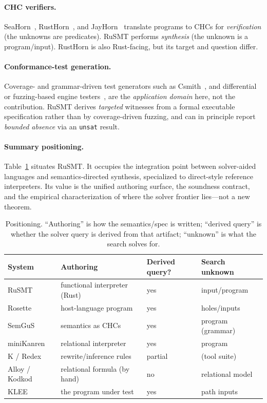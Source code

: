 \documentclass[11pt,a4paper]{article}
\theoremstyle{definition}
\theoremstyle{remark}
\newcommand{\rusmt}{RuSMT}
\newcommand{\code}[1]{\texttt{#1}}
\begin{document}
\paragraph{CHC verifiers.}
SeaHorn~\cite{gurfinkel2015seahorn}, RustHorn~\cite{matsushita2020rusthorn}, and
JayHorn~\cite{kahsai2016jayhorn} translate programs to CHCs for
\emph{verification} (the unknowns are predicates). \rusmt{} performs
\emph{synthesis} (the unknown is a program/input). RustHorn is also Rust-facing,
but its target and question differ.

\paragraph{Conformance-test generation.}
Coverage- and grammar-driven test generators such as
Csmith~\cite{yang2011csmith}, and differential or fuzzing-based engine
testers~\cite{park2021jest,ye2021comfort}, are the \emph{application domain} here,
not the contribution. \rusmt{} derives \emph{targeted} witnesses from a formal
executable specification rather than by coverage-driven fuzzing, and can in
principle report \emph{bounded absence} via an \code{unsat} result.

\paragraph{Summary positioning.}
Table~\ref{tab:position} situates \rusmt{}. It occupies the integration point
between solver-aided languages and semantics-directed synthesis, specialized to
direct-style reference interpreters. Its value is the unified authoring surface,
the soundness contract, and the empirical characterization of where the solver
frontier lies---not a new theorem.

\begin{table}[t]
\centering
\caption{Positioning. ``Authoring'' is how the semantics/spec is written;
``derived query'' is whether the solver query is derived from that artifact;
``unknown'' is what the search solves for.}
\label{tab:position}
\small
\begin{tabular}{@{}llll@{}}
\toprule
System & Authoring & Derived query? & Search unknown\\
\midrule
\rusmt{}            & functional interpreter (Rust)   & yes & input/program\\
Rosette               & host-language program           & yes & holes/inputs\\
SemGuS                & semantics as CHCs               & yes & program (grammar)\\
miniKanren            & relational interpreter          & yes & program\\
K / Redex             & rewrite/inference rules         & partial & (tool suite)\\
Alloy / Kodkod        & relational formula (by hand)    & no  & relational model\\
KLEE                  & the program under test          & yes & path inputs\\
\bottomrule
\end{tabular}
\end{table}
\end{document}
